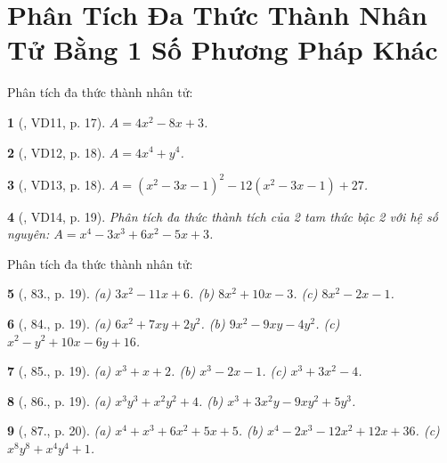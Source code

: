\documentclass{article}
\newtheorem{baitoan}{}
\begin{document}

\section{Phân Tích Đa Thức Thành Nhân Tử Bằng 1 Số Phương Pháp Khác}
Phân tích đa thức thành nhân tử:

\begin{baitoan}[\cite{Tuyen_Toan_8}, VD11, p. 17]
	$A = 4x^2 - 8x + 3$.
\end{baitoan}

\begin{baitoan}[\cite{Tuyen_Toan_8}, VD12, p. 18]
	$A = 4x^4 + y^4$.
\end{baitoan}

\begin{baitoan}[\cite{Tuyen_Toan_8}, VD13, p. 18]
	$A = (x^2 - 3x - 1)^2 - 12(x^2 - 3x - 1) + 27$.
\end{baitoan}

\begin{baitoan}[\cite{Tuyen_Toan_8}, VD14, p. 19]
	Phân tích đa thức thành tích của 2 tam thức bậc 2 với hệ số nguyên: $A = x^4 - 3x^3 + 6x^2 - 5x + 3$.
\end{baitoan}
Phân tích đa thức thành nhân tử:

\begin{baitoan}[\cite{Tuyen_Toan_8}, 83., p. 19]
	(a) $3x^2 - 11x + 6$. (b) $8x^2 + 10x - 3$. (c) $8x^2 - 2x - 1$.
\end{baitoan}

\begin{baitoan}[\cite{Tuyen_Toan_8}, 84., p. 19]
	(a) $6x^2 + 7xy + 2y^2$. (b) $9x^2 - 9xy - 4y^2$. (c) $x^2 - y^2 + 10x - 6y + 16$.
\end{baitoan}

\begin{baitoan}[\cite{Tuyen_Toan_8}, 85., p. 19]
	(a) $x^3 + x + 2$. (b) $x^3 - 2x - 1$. (c) $x^3 + 3x^2 - 4$.
\end{baitoan}

\begin{baitoan}[\cite{Tuyen_Toan_8}, 86., p. 19]
	(a) $x^3y^3 + x^2y^2 + 4$. (b) $x^3 + 3x^2y - 9xy^2 + 5y^3$.
\end{baitoan}

\begin{baitoan}[\cite{Tuyen_Toan_8}, 87., p. 20]
	(a) $x^4 + x^3 + 6x^2 + 5x + 5$. (b) $x^4 - 2x^3 - 12x^2 + 12x + 36$. (c) $x^8y^8 + x^4y^4 + 1$.
\end{baitoan}
\end{document}
